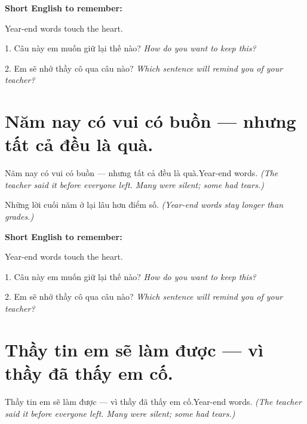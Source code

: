 \begin{ghinhoanh}
\textbf{Short English to remember:}

Year-end words touch the heart.

\end{ghinhoanh}

\begin{tuhocnhanh}
1. Câu này em muốn giữ lại thế nào? \textit{How do you want to keep this?}

2. Em sẽ nhớ thầy cô qua câu nào? \textit{Which sentence will remind you of your teacher?}
\end{tuhocnhanh}
\ngancach


\section{Năm nay có vui có buồn — nhưng tất cả đều là quà.}
\begin{truyen}{Năm nay có vui có buồn — nhưng tất cả đều là quà.}{Year-end words.}
\textit{(The teacher said it before everyone left. Many were silent; some had tears.)}
\end{truyen}

\begin{baihoc}
Những lời cuối năm ở lại lâu hơn điểm số.
\textit{(Year-end words stay longer than grades.)}
\end{baihoc}

\begin{ghinhoanh}
\textbf{Short English to remember:}

Year-end words touch the heart.

\end{ghinhoanh}

\begin{tuhocnhanh}
1. Câu này em muốn giữ lại thế nào? \textit{How do you want to keep this?}

2. Em sẽ nhớ thầy cô qua câu nào? \textit{Which sentence will remind you of your teacher?}
\end{tuhocnhanh}
\ngancach


\section{Thầy tin em sẽ làm được — vì thầy đã thấy em cố.}
\begin{truyen}{Thầy tin em sẽ làm được — vì thầy đã thấy em cố.}{Year-end words.}
\textit{(The teacher said it before everyone left. Many were silent; some had tears.)}
\end{truyen}

